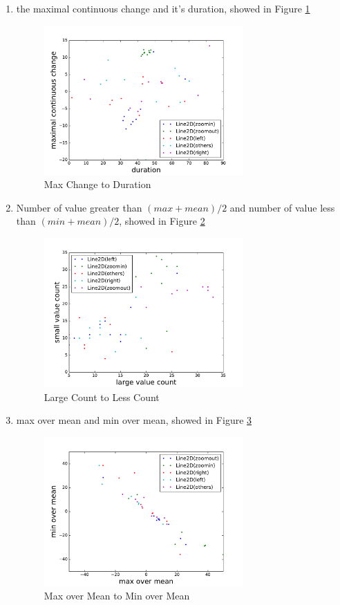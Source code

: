 \documentclass[conference]{IEEEtran}
\begin{document}
\begin{enumerate}
	\item the maximal continuous change and it's duration, showed in Figure \ref{max-change-duration}
	\begin{figure}[H]
	\label{max-change-duration}
	\centering
	\includegraphics[width=3in]{fs3.pdf}
	\caption{Max Change to Duration}
	\end{figure}

	\item Number of value greater than $(max+mean)/2$ and number of value less than $(min+mean)/2$, showed in Figure \ref{greater-less}
	\begin{figure}[H]
	\label{greater-less}
	\centering
	\includegraphics[width=3in]{fs5.pdf}
	\caption{Large Count to Less Count}
	\end{figure}

	\item max over mean and min over mean, showed in Figure \ref{max-min-over-mean}
	\begin{figure}[H]
	\label{max-min-over-mean}
	\centering
	\includegraphics[width=3in]{fs6.pdf}
	\caption{Max over Mean to Min over Mean}
	\end{figure}


\end{enumerate}
\end{document}
